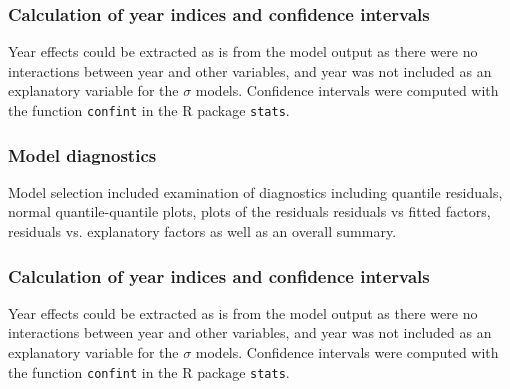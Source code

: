 \subsubsection{Calculation of year indices and confidence intervals}
 Year effects could be extracted as is from the model output as there were no interactions between year and other variables, and year was not included as an explanatory variable for the $\sigma$ models. Confidence intervals were computed with the function \texttt{confint} in the R package \texttt{stats}.
                                                                                      
                                                                                      
\subsubsection{Model diagnostics}                                                                                      
Model selection included examination of diagnostics including quantile residuals, normal quantile-quantile plots, plots of the  residuals residuals vs fitted factors, residuals  vs. explanatory factors as well as an overall summary.


\subsubsection{Calculation of year indices and confidence intervals}
Year effects could be extracted as is from the model output as there were no interactions between year and other variables, and year was not included as an explanatory variable for the $\sigma$ models. Confidence intervals were computed with the function \texttt{confint} in the R package \texttt{stats}.


